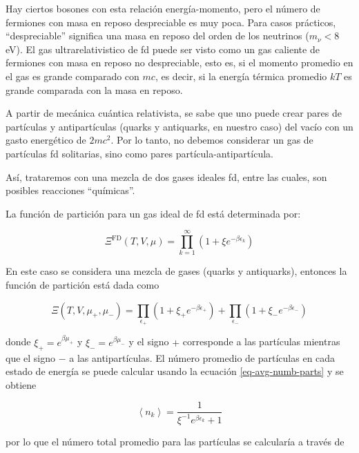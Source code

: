 Hay ciertos bosones con esta relación energía-momento, pero el número de fermiones con masa en reposo despreciable es muy poca. Para casos prácticos, ``despreciable'' significa una masa en reposo del orden de los neutrinos (${m}_{\nu} < 8 $eV). El gas ultrarelativistico de \acrfull{fd} puede ser visto como un gas caliente de fermiones con masa en reposo no despreciable, esto es, si el momento promedio en el gas es grande comparado con $mc$, es decir, si la energía térmica promedio $kT$ es grande comparada con la masa en reposo.

A partir de mecánica cuántica relativista, se sabe que uno puede crear pares de partículas y antipartículas (quarks y antiquarks, en nuestro caso) del vacío con un gasto energético de $2m{c}^{2}$. Por lo tanto, no debemos considerar un gas de partículas \acrshort{fd} solitarias, sino como pares partícula-antipartícula.

Así, trataremos con una mezcla de dos gases ideales \acrshort{fd}, entre las cuales, son posibles reacciones ``químicas''.

La función de partición para un gas ideal de \acrshort{fd}  está determinada por:

\begin{equation}
{\Xi}^{\mathrm{FD}}(T,V,\mu)=\prod_{k=1}^{\infty} \left(1 + \xi {e}^{-\beta {\epsilon}_{k}} \right)
\end{equation}

En este caso se considera una mezcla de gases (quarks y antiquarks), entonces la función de partición está dada como

\begin{equation}
\Xi\left(T,V,{\mu}_{+},{\mu}_{-}\right) = \prod_{{\epsilon}_{+}} \left(1+ {\xi}_{+}{e}^{-\beta {\epsilon}_{+}} \right) + \prod_{{\epsilon}_{-}} \left(1+ {\xi}_{-}{e}^{-\beta {\epsilon}_{-}} \right)
\end{equation}

donde ${\xi}_{+} = {e}^{\beta {\mu}_{+}}$ y ${\xi}_{-} = {e}^{\beta{\mu}_{-}}$ y el signo $+$ corresponde a las partículas mientras que el signo $-$ a las antipartículas. El número promedio de partículas en cada estado de energía se puede calcular usando la ecuación \eqref{eq-avg-numb-parts} y se obtiene

\begin{equation}\label{eq-FD-NumbParts}
\left\langle{n}_{k} \right\rangle = \frac{1}{{\xi}^{-1}{e}^{\beta{\epsilon}_{k}} + 1}
\end{equation}

por lo que el número total promedio para las partículas se calcularía a través de

